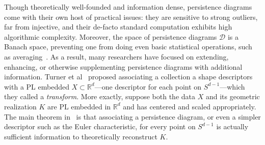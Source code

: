 \documentclass[10pt]{article}
\numberwithin{equation}{section}
\newcommand{\+}{%
	\raisebox{0.18ex}{\scaleobj{0.55}{+}}
}
\theoremstyle{definition}
\theoremstyle{definition}
\begin{document}

Though theoretically well-founded and information dense, persistence diagrams come with their own host of practical issues: they are sensitive to strong outliers, far from injective, and their de-facto standard computation exhibits high algorithmic complexity. 
Moreover, the space of persistence diagrams $\mathcal{D}$ is a Banach space, preventing one from doing even basic statistical operations, such as averaging~\cite{}. 
As a result, many researchers have focused on extending, enhancing, or otherwise supplementing persistence diagrams with additional information. 
Turner et al~\cite{} proposed associating a collection a shape descriptors with a PL embedded $X \subset \mathbb{R}^d$---one descriptor for each point on $S^{d-1}$---which they called a \emph{transform}. 
More exactly, suppose both the data $X$ and its geometric realization $K$ are PL embedded in $\mathbb{R}^d$ and has centered and scaled appropriately.
The main theorem in~\cite{} is that associating a persistence diagram, or even a simpler descriptor such as the Euler characteristic, for every point on $S^{d-1}$ is actually sufficient information to theoretically reconstruct $K$. 
\end{document}
